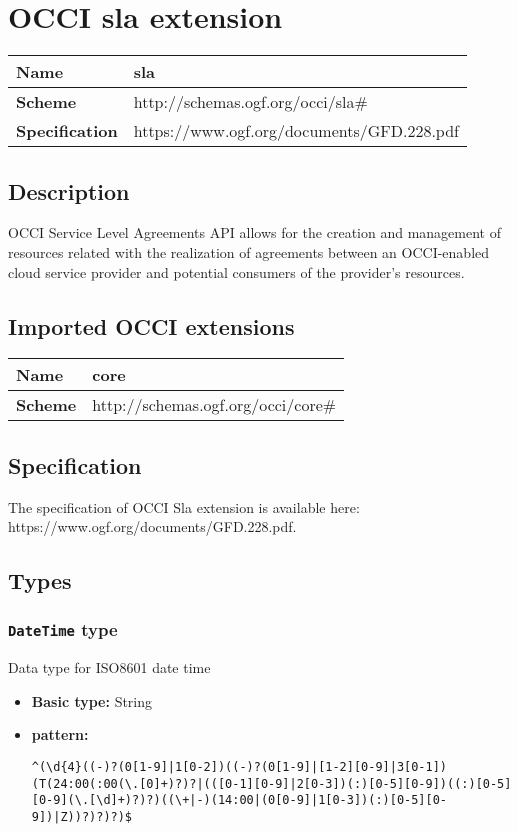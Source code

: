 \section{OCCI sla extension}
\begin{center}
\begin{tabular}{|l|l|}
  \hline
  \textbf{Name} & sla \\
  \hline  
  \textbf{Scheme} & http://schemas.ogf.org/occi/sla\# \\
  \hline
  \textbf{Specification} & https://www.ogf.org/documents/GFD.228.pdf \\
  \hline
\end{tabular}
\end{center}

\subsection{Description}
OCCI Service Level Agreements API allows for the creation and management of resources related with the realization of agreements between an OCCI-enabled cloud service provider and potential consumers of the provider's resources.
\subsection{Imported OCCI extensions}

\begin{center} 
\begin{tabular}{|l|l|}
  \hline
  \textbf{Name} & core \\
  \hline  
  \textbf{Scheme} & http://schemas.ogf.org/occi/core\# \\
  \hline
\end{tabular}
\end{center}


\subsection{Specification}
The specification of OCCI Sla extension is available here: https://www.ogf.org/documents/GFD.228.pdf.
\subsection{Types}
\subsubsection{\texttt{DateTime} type}
Data type for ISO8601 date time
\begin{itemize}
\item \textbf{Basic type:} String
	\item \textbf{pattern:} \begin{verbatim}^(\d{4}((-)?(0[1-9]|1[0-2])((-)?(0[1-9]|[1-2][0-9]|3[0-1])(T(24:00(:00(\.[0]+)?)?|(([0-1][0-9]|2[0-3])(:)[0-5][0-9])((:)[0-5][0-9](\.[\d]+)?)?)((\+|-)(14:00|(0[0-9]|1[0-3])(:)[0-5][0-9])|Z))?)?)?)$\end{verbatim}
\end{itemize}
